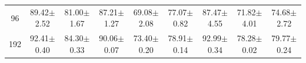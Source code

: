 \begin{table}[p]
\begin{tabular}{ccccccccc}
96 & 89.42{\scriptsize$\pm$2.52} & 81.00{\scriptsize$\pm$1.67} & 87.21{\scriptsize$\pm$1.27} & 69.08{\scriptsize$\pm$2.08} & 77.07{\scriptsize$\pm$0.82} & 87.47{\scriptsize$\pm$4.55} & 71.82{\scriptsize$\pm$4.01} & 74.68{\scriptsize$\pm$2.72} \\
192 & 92.41{\scriptsize$\pm$0.40} & 84.30{\scriptsize$\pm$0.33} & 90.06{\scriptsize$\pm$0.07} & 73.40{\scriptsize$\pm$0.20} & 78.91{\scriptsize$\pm$0.14} & 92.99{\scriptsize$\pm$0.34} & 78.28{\scriptsize$\pm$0.02} & 79.77{\scriptsize$\pm$0.24} \\
\bottomrule
\end{tabular}
\end{table}
